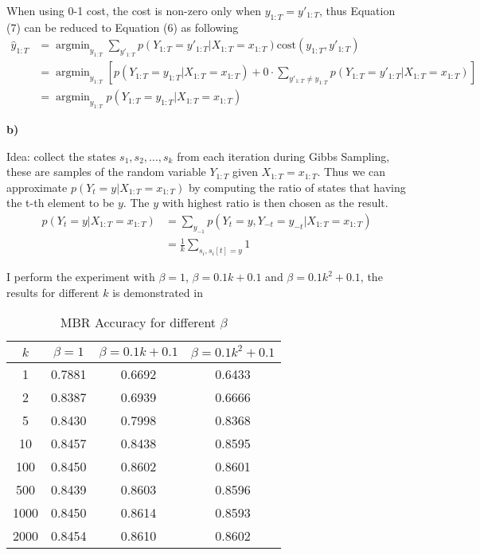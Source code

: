 \documentclass{article}
\DeclareMathOperator*{\argmin}{argmin}
\begin{document}
When using 0-1 cost, the cost is non-zero only when $y_{1:T} = y'_{1:T}$, thus Equation (7) can be reduced to Equation (6) 
as following
\begin{align*}
\hat y_{1:T} &= \argmin_{y_{1:T}} \sum_{y'_{1:T}}p(Y_{1:T} = y'_{1:T} | X_{1:T} = x_{1:T})\text{cost}(y_{1:T}, y'_{1:T}) \\
&=\argmin_{y_{1:T}}\left[p(Y_{1:T} = y_{1:T} | X_{1:T} = x_{1:T}) + 0\cdot\sum_{y'_{1:T} \neq y_{1:T}}p(Y_{1:T} = y'_{1:T} | X_{1:T} = x_{1:T})\right]\\
&=\argmin_{y_{1:T}}p(Y_{1:T} = y_{1:T} | X_{1:T} = x_{1:T})
\end{align*}

\textbf{b)}

Idea: collect the states $s_1, s_2,\hdots,s_k$ from each iteration during Gibbs Sampling, these are samples of the random variable $Y_{1:T}$ given $X_{1:T} = x_{1:T}$. Thus we can approximate $p(Y_t = y|X_{1:T}=x_{1:T})$ by computing the ratio of states that having
the t-th element to be $y$. The $y$ with highest ratio is then chosen as the result.
\begin{align*}
p(Y_t = y|X_{1:T}=x_{1:T}) &= \sum_{y_{-1}}p(Y_t = y, Y_{-t} = y_{-t}|X_{1:T} =x_{1:T})\\
&=\frac{1}{k}\sum_{s_i, s_i[t] = y} 1
\end{align*}

I perform the experiment with $\beta = 1$, $\beta = 0.1k+0.1$ and $\beta = 0.1k^2+0.1$, the results for different $k$ is demonstrated in 

\begin{table}
\centering
\begin{tabular}{c|c|c|c}
\textbf{$k$} &$\beta=1$ &\textbf{$\beta = 0.1k+0.1$} & \textbf{$\beta=0.1k^2+0.1$} \\\hline
1 & 0.7881& 0.6692&0.6433 \\\hline
2 & 0.8387& 0.6939&0.6666\\\hline
5 & 0.8430&0.7998 &0.8368 \\\hline
10 & 0.8457& 0.8438& 0.8595\\\hline
100 & 0.8450& 0.8602 &0.8601\\\hline
500 &0.8439 &  0.8603&0.8596\\\hline
1000 & 0.8450 & 0.8614& 0.8593\\\hline
2000 &0.8454  &0.8610 & 0.8602\\
\end{tabular}
\caption{MBR Accuracy for different $\beta$}
\label{tab:mbr}
\end{table}
\end{document}
